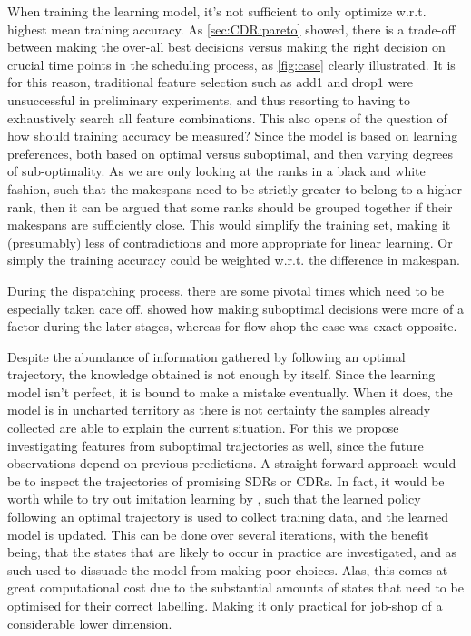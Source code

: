 \documentclass[smallextended]{svjour3}
\begin{document}
	When training the learning model, it's not sufficient to only optimize w.r.t. highest mean training accuracy. As \cref{sec:CDR:pareto} showed, there is a trade-off between making the over-all best decisions versus making the right decision on crucial time points in the scheduling process, as \cref{fig:case} clearly illustrated. It is for this reason, traditional feature selection such as add1 and drop1 were unsuccessful in preliminary experiments, and thus resorting to having to exhaustively search all feature combinations.
	This also opens of the question of how should training accuracy be measured? Since the model is based on learning preferences, both based on optimal versus suboptimal, and then varying degrees of sub-optimality. As we are only looking at the ranks in a black and white fashion, such that the makespans need to be strictly greater to belong to a higher rank, then it can be argued that some ranks should be grouped together if their makespans are sufficiently close. This would simplify the training set, making it (presumably) less of contradictions and more appropriate for linear learning. Or simply the training accuracy could be weighted w.r.t. the  difference in makespan.
	
	During the dispatching process, there are some pivotal times which need to be especially taken care off.  showed how making suboptimal decisions were more of a factor during the later stages, whereas for flow-shop the case was exact opposite. 
	
	Despite the abundance of information gathered by following an optimal trajectory, the knowledge obtained is not enough by itself. Since the learning model isn't perfect, it is bound to make a mistake eventually. When it does, the model is in uncharted  territory as there is not certainty the samples already collected are able to explain the current situation. For this we propose investigating features from suboptimal trajectories as well, since the future observations depend on previous predictions. 
	 A straight forward approach would be to inspect the trajectories of promising SDRs or CDRs. 
	In fact, it would be worth while to try out imitation learning by \cite{RossB10,RossGB11}, such that the learned policy following an optimal trajectory is used to collect training data, and the learned model is updated. This can be done over several iterations, with the benefit being, that the states that are likely to occur in practice are investigated, and as such used to dissuade the model from making poor choices. Alas, this comes at great computational cost due to the substantial amounts of states that need to be optimised for their correct labelling. Making it only practical for job-shop of a considerable lower dimension. 
	
\end{document}
